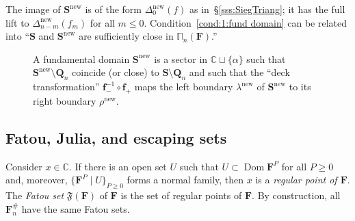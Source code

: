 \documentclass{amsart}
\newcommand{\Dom}{\operatorname {Dom}}
\newcommand{\1}{{\mathbb 1 }}
\newcommand{\bDelta}{{\mathbb{\Delta}}}
\newcommand{\bPi}{{\mathbb{\Pi}}}
\newcommand{\bF}{{\mathbf F}}
\newcommand{\bQ}{{\mathbf Q}}
\newcommand{\bS}{{\mathbf S}}
\newcommand{\bbf}{{\mathbf f}}
\newcommand\new{{\operatorname{new}}}
\newcommand{\C}{\mathbb{C}}
\theoremstyle{remark}
\numberwithin{equation}{section}
\theoremstyle{definition}
\newcommand{\Fat}{{\mathfrak F}}
\theoremstyle{nonumberbreak}
\begin{document}
The image of $\bS^\new$ is of the form $\bDelta_0^\new(f)$ as in~\S\ref{sss:SiegTriang}; it has the full lift to $\bDelta^\new_{n-m}(f_m)$ for all $m\le 0$. Condition~\eqref{cond:1:fund domain} can be related into ``$\bS$ and $\bS^\new$ are sufficiently close in $\bPi_n(\bF)$.''  




\begin{figure}[t!]

\caption{A fundamental domain $\bS^\new$ is a sector in $\C\sqcup \{\alpha\}$ such that $\bS^\new \setminus \bQ_n$ coincide (or close) to $\bS\setminus \bQ_n$ and such that the ``deck transformation'' $\bbf_-^{-1}\circ \bbf_+$ maps the left boundary $\lambda^\new$ of $\bS^\new$ to its right boundary  $\rho^\new$. }\label{Fig:FundDomain}
\end{figure}





\subsection{Fatou, Julia, and escaping sets}
\label{ss:Fat Jul  Esc}
 
Consider $x\in \C$. If there is an open set $U$ such that $U\subset \Dom \bF^P $ for all $P\ge 0$ and, moreover, $\{\bF^P\mid U\}_{P\ge 0}$ forms a normal family, then $x$ is a \emph{regular point of $\bF$}. The \emph{Fatou set} $\Fat(\bF)$ of $\bF$ is the set of regular points of $\bF$. By construction, all $\bF^{\#}_{n}$ have the same Fatou sets.
\end{document}
